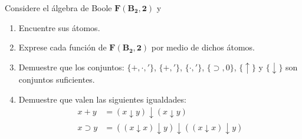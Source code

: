 \begin{exercise}
  Considere el álgebra de Boole $\mathbf{F(B_{2},2)}$ y
  \begin{enumerate}
  \item Encuentre sus átomos.
  \item Exprese cada función de $\mathbf{F(B_{2},2)}$ por medio de
    dichos átomos.
  \item Demuestre que los conjuntos: $\{+,\cdot,'\}$, $\{+,'\}$,
    $\{\cdot,'\}$, $\{\supset,0\}$, $\{\uparrow\}$ y 
    $\{\downarrow\}$ son conjuntos suficientes.
  \item Demuestre que valen las siguientes igualdades:
    \begin{align*}
      x+y&=(x\downarrow y)\downarrow (x\downarrow y)\\
      x\supset y&=
         ((x\downarrow x)\downarrow y)\downarrow ((x\downarrow x)\downarrow y) 
    \end{align*}
  \end{enumerate}
\end{exercise}

